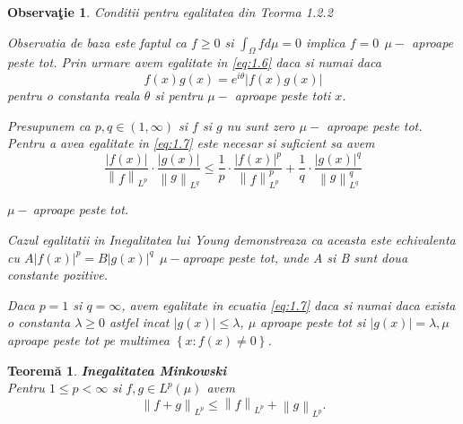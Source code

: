 \documentclass[a4paper,12pt,oneside]{report}
\newtheorem{theorem}{Teorem\u a}
\newtheorem{remark}{Observa\c{t}ie}
\begin{document}
\begin{remark}

Conditii pentru egalitatea din Teorma 1.2.2

Observatia de baza este faptul ca  \(f\geq 0\) si \(\int_{\Omega }f d\mu  = 0\) implica \(f = 0~~ \mu-\) aproape peste tot.
	Prin urmare avem egalitate in \ref{eq:1.6} daca si numai daca
\begin{displaymath}
  f\left ( x \right )g\left ( x \right ) = e^{i\theta }\left | f\left ( x \right ) g\left ( x \right )\right |
\end{displaymath}
pentru o constanta reala \(\theta\) si pentru \(\mu-\) aproape peste toti \(x\).


	Presupunem ca \(p , q \in \left ( 1 , \infty  \right )\) si \(f\) si \(g\) nu sunt zero \(\mu-\) aproape peste tot. Pentru a avea egalitate in \ref{eq:1.7} este necesar si suficient sa avem
\begin{displaymath}
  \frac{\left | f\left ( x \right ) \right |}{\left \| f \right \|_{L^{p}}} \cdot \frac{\left | g\left ( x \right ) \right |}{\left \| g \right \|_{L^{q}}}\leq \frac{1}{p}\cdot \frac{\left | f\left ( x \right ) \right |^{p}}{\left \| f \right \|^{p}_{L^{p}}} + \frac{1}{q}\cdot \frac{\left | g\left ( x \right ) \right |^{q}}{\left \| g \right \|^{q}_{L^{q}}}
\end{displaymath}

\(\mu-~\)aproape peste tot.

Cazul egalitatii in Inegalitatea lui Young demonstreaza ca aceasta este echivalenta cu \(A\left | f\left ( x \right ) \right |^{p} = B\left | g\left ( x \right ) \right |^{q}~~ \mu-\)aproape peste tot,
unde A si B sunt doua constante pozitive.

	Daca \(p = 1\) si \(q = \infty\), avem egalitate in ecuatia \ref{eq:1.7} daca si numai daca exista o constanta \(\lambda \geq 0\) astfel incat \(\left | g\left ( x \right ) \right |\leq \lambda\),  \(\mu\) aproape peste tot si \(\left | g\left ( x \right ) \right |= \lambda,  \mu\) aproape peste tot pe multimea \(\left \{ x : f\left ( x \right )\neq 0 \right \}\).
\end{remark}
\begin{theorem}
\textbf{Inegalitatea Minkowski}\\

Pentru \(1\leq  p < \infty\) si \(f , g \in L^{p}\left ( \mu  \right ) \) avem
\begin{displaymath}
  \left \| f + g  \right \|_{L^{p}}\leq \left \| f \right \|_{L^{p}} + \left \| g \right \|_{L^{p}}. \label{eq:1.10} \tag{1.10}
\end{displaymath}
\end{theorem}
\end{document}
